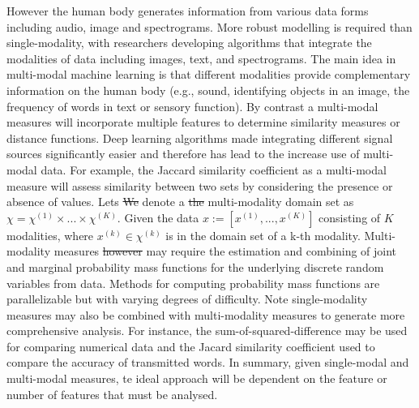 \documentclass[10pt]{article}[draft]
\begin{document}
		However the human body generates information from various data forms including audio, image and spectrograms. More robust modelling is required than single-modality, with researchers developing algorithms that integrate the modalities of data including images, text, and spectrograms. The main idea in multi-modal machine learning is that different modalities provide complementary information on the human body (e.g., sound, identifying objects in an image, the frequency of words in text or sensory function).  By contrast a multi-modal measures will incorporate multiple  features to determine similarity measures or distance functions. Deep learning algorithms made integrating different signal sources significantly easier and therefore has lead to the increase use of multi-modal data.  For example, the Jaccard similarity coefficient as a multi-modal measure will assess similarity between two sets by considering the presence or absence of  values. Lets \st{We} denote a \st{the} multi-modality domain set as $\chi =  \chi^{(1)} \times ... \times \chi^{(K)} $. Given the data $x := [x^{(1)}, ... , x^{(K)}]$ consisting of $K$ modalities, where $x^{(k)}  \in \chi^{(k)}$ is in the domain set of a k-th modality. Multi-modality measures \st{however} may require the estimation and combining of joint and marginal probability mass functions for the underlying discrete random variables from data. Methods for computing probability mass functions  are parallelizable but with varying degrees of difficulty. Note single-modality measures may also be combined with multi-modality measures to generate more comprehensive analysis. For instance, the sum-of-squared-difference may be used for comparing numerical data and the Jacard similarity coefficient used to compare the accuracy of transmitted words. In summary, given single-modal and multi-modal measures, te ideal approach will be dependent on the feature or number of features that must be analysed.
		
\end{document}
